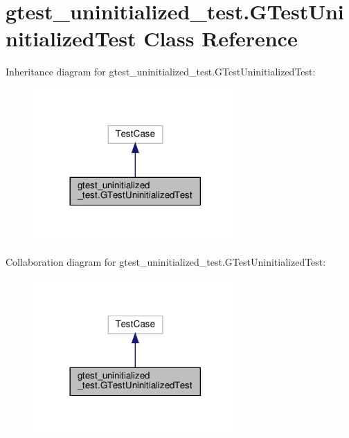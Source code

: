 \hypertarget{classgtest__uninitialized__test_1_1_g_test_uninitialized_test}{}\section{gtest\+\_\+uninitialized\+\_\+test.\+G\+Test\+Uninitialized\+Test Class Reference}
\label{classgtest__uninitialized__test_1_1_g_test_uninitialized_test}


Inheritance diagram for gtest\+\_\+uninitialized\+\_\+test.\+G\+Test\+Uninitialized\+Test\+:
\nopagebreak
\begin{figure}[H]
\begin{center}
\leavevmode
\includegraphics[width=221pt]{classgtest__uninitialized__test_1_1_g_test_uninitialized_test__inherit__graph}
\end{center}
\end{figure}


Collaboration diagram for gtest\+\_\+uninitialized\+\_\+test.\+G\+Test\+Uninitialized\+Test\+:
\nopagebreak
\begin{figure}[H]
\begin{center}
\leavevmode
\includegraphics[width=221pt]{classgtest__uninitialized__test_1_1_g_test_uninitialized_test__coll__graph}
\end{center}
\end{figure}
